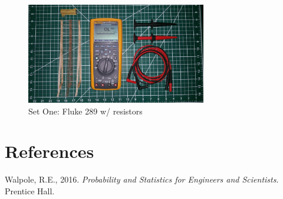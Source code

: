 \documentclass[10pt]{report}
\begin{document}
\begin{figure}[h!]
    \centering
    \includegraphics[width=0.7\textwidth]{process/dmm_resistors}
    \caption{Set One: Fluke 289 w/ resistors}
\end{figure}

\newpage
\section*{References}

Walpole, R.E., 2016. \textit{Probability and Statistics for Engineers and Scientists}. Prentice Hall.
\newline
\newline
\end{document}

